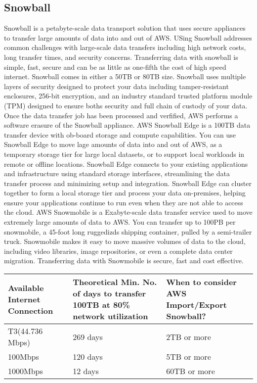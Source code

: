 \documentclass{article}
\begin{document}
	\subsection{Snowball}
	Snowball is a petabyte-scale data transport solution that uses secure appliances to transfer large amounts of data into and out of AWS. USing Snowball addresses common challenges with large-scale data transfers including high network costs, long transfer times, and security concerns.  Transferring data with snowball is simple, fast, secure and can be as little as one-fifth the cost of high speed internet. Snowball comes in either a 50TB or 80TB size. Snowball uses multiple layers of security designed to protect your data including tamper-resistant enclosures, 256-bit encryption, and an industry standard trusted platform module (TPM) designed to ensure boths security and full chain of custody of your data. Once the data transfer job has been processed and verfified, AWS performs a software erasure of the Snowball appliance. AWS Snowball Edge is a 100TB data transfer device with ob-board storage and compute capabilities. You can use Snowball Edge to move lage amounts of data into and out of AWS, as a temporary storage tier for large local datasets, or to support local workloads in remote or offline locations.  Snowball Edge connects to your existing applications and infrastructure using standard storage interfaces, streamlining the data transfer process and minimizing setup and integration. Snowball Edge can cluster together to form a local storage tier and process your data on-premises, helping ensure your applications continue to run even when they are not able to access the cloud. AWS Snowmobile is a Exabyte-scale data transfer service used to move extremely large amounts of data to AWS. You can transfer up to 100PB per snowmobile, a 45-foot long ruggedizds shipping container, pulled by a semi-trailer truck. Snowmobile makes it easy to move massive volumes of data to the cloud, including video libraries, image repositories, or even a complete data center migration. Transferring data with Snowmobile is secure, fast and cost effective.
	
	\begin{center}
		\begin{tabular}{ |p{3cm}|p{3cm}|p{3cm}|}		
		\hline
		Available Internet Connection & Theoretical Min. No. of days to transfer 100TB at 80\% network utilization & When to consider AWS Import/Export Snowball? \\
	 	\hline
	 	T3(44.736 Mbps) & 269 days & 2TB or more \\ 
	 	100Mbps & 120 days & 5TB or more \\ 
	 	1000Mbps & 12 days & 60TB or more \\ 
	 	\hline
		\end{tabular}
	\end{center}
\end{document}

